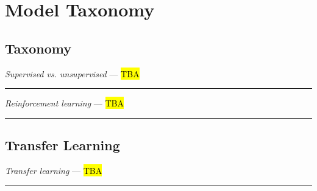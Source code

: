 \section{Model Taxonomy}
\subsection*{Taxonomy}
\emph{Supervised vs. unsupervised} --- \hl{TBA}

{\color{lightgray}\hrule height 0.001mm}

\emph{Reinforcement learning} --- \hl{TBA}

{\color{black}\hrule height 0.001mm}

\subsection*{Transfer Learning}
\emph{Transfer learning} --- \hl{TBA}

{\color{black}\hrule height 0.001mm}

